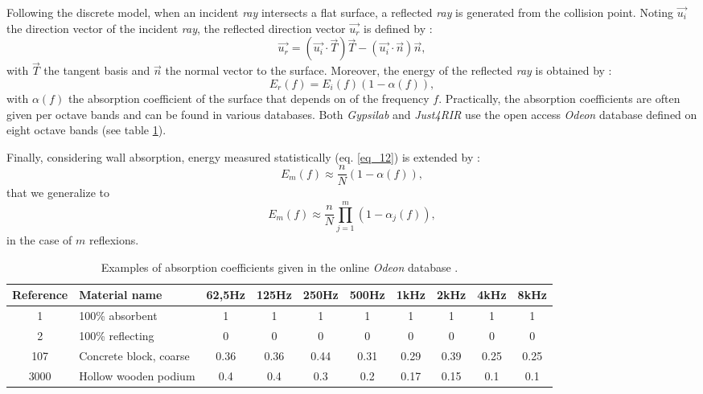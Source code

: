 \documentclass[AMA,STIX1COL]{WileyNJD-v2}
\begin{document}
Following the discrete model, when an incident \textit{ray} intersects a flat surface, a reflected \textit{ray} is generated from the collision point. Noting $\overrightarrow{u_i}$ the direction vector of the incident  \textit{ray}, the reflected direction vector $\overrightarrow{u_r}$ is defined by :
\begin{equation}
\label{eq_15}
\overrightarrow{u_r} = (\overrightarrow{u_i} \cdot \overrightarrow{T})\overrightarrow{T} - (\overrightarrow{u_i} \cdot \overrightarrow{n})\overrightarrow{n},
\end{equation}
with $\overrightarrow{T}$ the tangent basis and $\overrightarrow{n}$ the normal vector to the surface. Moreover, the energy of the reflected \textit{ray} is obtained by :
\begin{equation}
E_r(f) = E_i(f)(1 - \alpha(f)),
\end{equation}
with $\alpha(f)$  the absorption coefficient of the surface that depends on of the frequency $f$. Practically, the absorption coefficients are often given per octave bands and can be found in various databases. Both \textit{Gypsilab} and \textit{Just4RIR} use the open access \textit{Odeon} database \cite{odeon} defined on eight octave bands (see table \ref{tab_coeff_abs}). 

Finally, considering wall absorption, energy measured statistically (eq. \ref{eq_12}) is extended by :
\begin{equation}
E_m(f) \approx  \frac{n}{N}(1 - \alpha(f)),
\end{equation}
that we generalize to
\begin{equation}
E_m(f) \approx  \frac{n}{N}\prod_{j=1}^{m}(1 - \alpha_j(f)),
\label{eq_18}
\end{equation}
in the case of $m$ reflexions.

\begin{table}[t]
\centering
	\begin{tabular}{| c | m{2.5cm} | *{8}{c|}}
		\hline
		Reference & Material name & 62,5Hz & 125Hz & 250Hz & 500Hz & 1kHz & 2kHz & 4kHz & 8kHz \\
		  \hline
		  \hline
		   1 & 100\% absorbent & 1 & 1 & 1 & 1 & 1 & 1 & 1 & 1 \\
		   \hline
		2 & 100\% reflecting & 0 & 0 & 0 & 0 & 0 & 0 & 0 & 0 \\
		   \hline
		107 & Concrete block, coarse\footnotemark & 0.36 & 0.36 & 0.44 & 0.31 & 0.29 & 0.39 & 0.25 & 0.25 \\
		   \hline
		3000 & Hollow wooden podium\footnotemark & 0.4 & 0.4 & 0.3 & 0.2 & 0.17 & 0.15 & 0.1 & 0.1 \\
	     \hline
	 \end{tabular}
	\caption{Examples of absorption coefficients given in the online \textit{Odeon} database \cite{odeon}.}
	 \label{tab_coeff_abs}
\end{table}
\addtocounter{footnote}{-1}
\addtocounter{footnote}{1}
\end{document}
